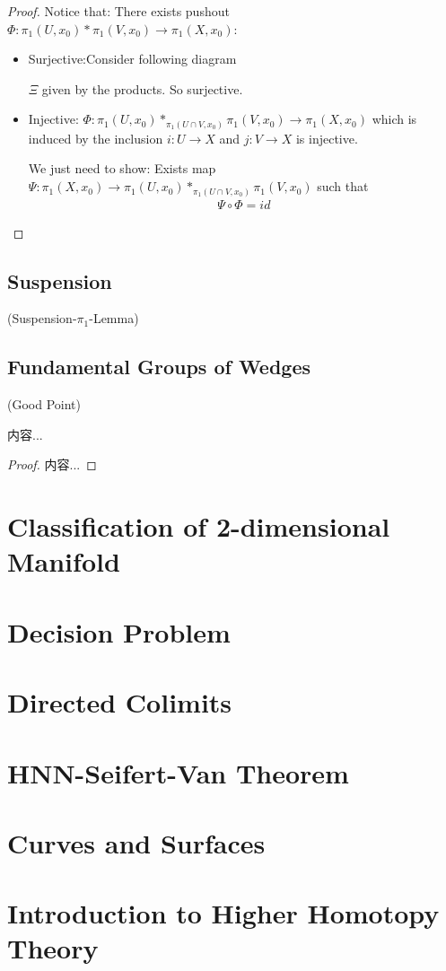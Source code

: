\documentclass[Total.tex]{subfiles}
\begin{document}
	\begin{proof}
		Notice that: There exists pushout $\Phi:\pi_1(U,x_0)*\pi_1(V,x_0)\rightarrow \pi_1(X,x_0)$:
		\begin{itemize}
			\item Surjective:Consider following diagram
			\begin{center}
			\end{center}
			$\Xi$ given by the products. So surjective.
			\item Injective: $\Phi:\pi_1(U,x_0)*_{\pi_1(U\cap V,x_0)} \pi_1(V,x_0)\rightarrow \pi_1(X,x_0)$ which is induced by the inclusion $i:U\rightarrow X$ and $j:V\rightarrow X$ is injective.
			
			We just need to show: Exists map  $\Psi:\pi_1(X,x_0)\rightarrow \pi_1(U,x_0)*_{\pi_1(U\cap V,x_0)} \pi_1(V,x_0)$ such that 
			\begin{gather*}
				\Psi\circ \Phi=id
			\end{gather*}
		\end{itemize}
	\end{proof}
	\subsection{Suspension}
	\begin{Def}
		
	\end{Def}
	\begin{lemma}
		(Suspension-$\pi_1$-Lemma)
	\end{lemma}
	\subsection{Fundamental Groups of Wedges}
	\begin{Def}
		(Good Point) 
	\end{Def}
	
	\begin{lemma}
		内容...
	\end{lemma}
	\begin{proof}
		内容...
	\end{proof}
	\section{Classification of 2-dimensional Manifold}
	\section{Decision Problem}
	\section{Directed Colimits}
	\section{HNN-Seifert-Van Theorem}
	\section{Curves and Surfaces}
	\section{Introduction to Higher Homotopy Theory}
\end{document}
